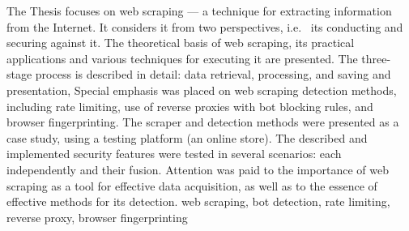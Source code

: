 \abstract
The Thesis focuses on web scraping --- a technique for extracting information from the Internet.
It considers it from two perspectives, i.e.~ its conducting and securing against it.
The theoretical basis of web scraping, its practical applications and various techniques for executing it are presented.
The three-stage process is described in detail: data retrieval, processing, and saving and presentation,
Special emphasis was placed on web scraping detection methods, including rate limiting,
use of reverse proxies with bot blocking rules, and browser fingerprinting.
The scraper and detection methods were presented as a case study, using a testing platform (an online store).
The described and implemented security features were tested in several scenarios: each independently and their fusion.
Attention was paid to the importance of web scraping as a tool for effective data acquisition, as well as to the essence of effective methods for its detection.
\keywords web scraping, bot detection, rate limiting, reverse proxy, browser fingerprinting